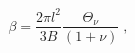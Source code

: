 \begin{equation}
\beta =\frac{2\pi l^{2}}{3B}\frac{\Theta _{\nu }}{(1+\nu )}\;,
\label{Temperature}
\end{equation}

